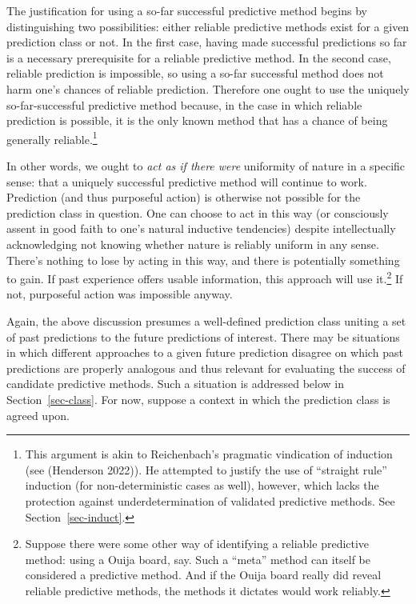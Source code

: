 \documentclass[
  letterpaper,
  DIV=11,
  numbers=noendperiod]{scrartcl}
\theoremstyle{definition}
\theoremstyle{remark}
\begin{document}
The justification for using a so-far successful predictive method begins
by distinguishing two possibilities: either reliable predictive methods
exist for a given prediction class or not. In the first case, having
made successful predictions so far is a necessary prerequisite for a
reliable predictive method. In the second case, reliable prediction is
impossible, so using a so-far successful method does not harm one's
chances of reliable prediction. Therefore one ought to use the uniquely
so-far-successful predictive method because, in the case in which
reliable prediction is possible, it is the only known method that has a
chance of being generally reliable.\footnote{This argument is akin to
  Reichenbach's pragmatic vindication of induction (see (Henderson
  2022)). He attempted to justify the use of ``straight rule'' induction
  (for non-deterministic cases as well), however, which lacks the
  protection against underdetermination of validated predictive methods.
  See Section~\ref{sec-induct}.}

In other words, we ought to \emph{act as if there were} uniformity of
nature in a specific sense: that a uniquely successful predictive method
will continue to work. Prediction (and thus purposeful action) is
otherwise not possible for the prediction class in question. One can
choose to act in this way (or consciously assent in good faith to one's
natural inductive tendencies) despite intellectually acknowledging not
knowing whether nature is reliably uniform in any sense. There's nothing
to lose by acting in this way, and there is potentially something to
gain. If past experience offers usable information, this approach will
use it.\footnote{Suppose there were some other way of identifying a
  reliable predictive method: using a Ouija board, say. Such a ``meta''
  method can itself be considered a predictive method. And if the Ouija
  board really did reveal reliable predictive methods, the methods it
  dictates would work reliably.} If not, purposeful action was
impossible anyway.

Again, the above discussion presumes a well-defined prediction class
uniting a set of past predictions to the future predictions of interest.
There may be situations in which different approaches to a given future
prediction disagree on which past predictions are properly analogous and
thus relevant for evaluating the success of candidate predictive
methods. Such a situation is addressed below in Section~\ref{sec-class}.
For now, suppose a context in which the prediction class is agreed upon.
\end{document}
